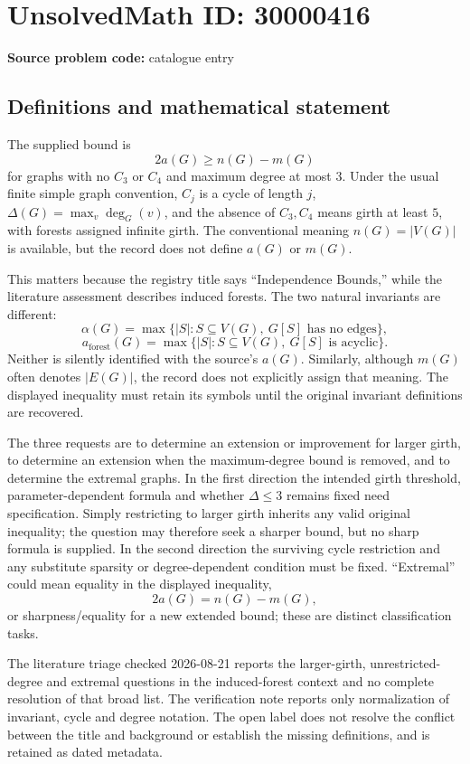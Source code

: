 \documentclass[11pt]{article}
\begin{document}
\section*{UnsolvedMath ID: 30000416}
\textbf{Source problem code:} catalogue entry
\subsection{Definitions and mathematical statement}
The supplied bound is
\[
 2a(G)\geq n(G)-m(G)
\]
for graphs with no \(C_3\) or \(C_4\) and maximum degree at most \(3\). Under the usual finite simple graph convention, \(C_j\) is a cycle of length \(j\), \(\Delta(G)=\max_v\deg_G(v)\), and the absence of \(C_3,C_4\) means girth at least \(5\), with forests assigned infinite girth. The conventional meaning \(n(G)=|V(G)|\) is available, but the record does not define \(a(G)\) or \(m(G)\).

This matters because the registry title says ``Independence Bounds,'' while the literature assessment describes induced forests. The two natural invariants are different:
\[
 \alpha(G)=\max\{|S|:S\subseteq V(G),\ G[S]\text{ has no edges}\},
\]
\[
 a_{\mathrm{forest}}(G)=\max\{|S|:S\subseteq V(G),\ G[S]\text{ is acyclic}\}.
\]
Neither is silently identified with the source's \(a(G)\). Similarly, although \(m(G)\) often denotes \(|E(G)|\), the record does not explicitly assign that meaning. The displayed inequality must retain its symbols until the original invariant definitions are recovered.

The three requests are to determine an extension or improvement for larger girth, to determine an extension when the maximum-degree bound is removed, and to determine the extremal graphs. In the first direction the intended girth threshold, parameter-dependent formula and whether \(\Delta\leq3\) remains fixed need specification. Simply restricting to larger girth inherits any valid original inequality; the question may therefore seek a sharper bound, but no sharp formula is supplied. In the second direction the surviving cycle restriction and any substitute sparsity or degree-dependent condition must be fixed. ``Extremal'' could mean equality in the displayed inequality,
\[
 2a(G)=n(G)-m(G),
\]
or sharpness/equality for a new extended bound; these are distinct classification tasks.

The literature triage checked 2026-08-21 reports the larger-girth, unrestricted-degree and extremal questions in the induced-forest context and no complete resolution of that broad list. The verification note reports only normalization of invariant, cycle and degree notation. The open label does not resolve the conflict between the title and background or establish the missing definitions, and is retained as dated metadata.
\end{document}
